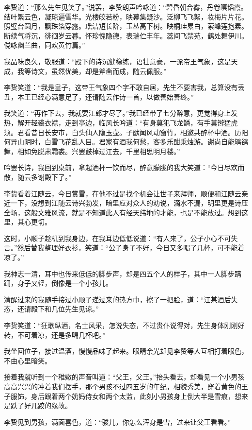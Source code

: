 李贽道：“那么先生见笑了。”说罢，李贽朗声吟咏道：“碧昏朝合雾，丹卷暝韬霞。结叶繁云色，凝琼遍雪华。光楼皎若粉，映幕集疑沙。泛柳飞飞絮，妆梅片片花。照璧台圆月，飘珠箔穿露。瑶洁短长阶，玉丛高下树。映桐珪累白，萦峰莲抱素。断续气将沉，徘徊岁云暮。怀珍愧隐德，表瑞伫丰年。蕊间飞禁苑，鹤处舞伊川。傥咏幽兰曲，同欢黄竹篇。”

我品味良久，敬服道：“殿下的诗沉健稳练，语壮意豪，一派帝王气象，这是天成，我等诗文，虽然优美，却是斧凿而成，随云佩服。”

李贽笑道：“我是皇子，这帝王气象四个字不敢自居，先生不要害我，总算没有丢丑，本王已经心满意足了，还请随云作诗一首，以做善始善终。”

我笑道：“再作下去，我就要江郎才尽了。”我已经带了七分醉意，更觉得身上发热，解开轻裘衣襟，走到亭边，临风长吟道：“有身莫犯飞龙鳞，有手莫辫猛虎须。君看昔日长安市，白头仙人隐玉壶。子猷闻风动窗竹，相邀共醉杯中酒。历阳何异山阴时，白雪飞花乱人目。君家有酒我何愁，客多乐酣秉烛游。谢尚自能鸲鹆舞，相如免脱肃霜裘。兴罢鼓棹过江去，千里相思明月楼。”

吟罢长诗，我回到桌前，拿起酒杯一饮而尽，醉意朦胧的我大笑道：“今日尽欢而散，随云多谢殿下了。”

李贽看着江随云，今日赏雪，在他不过是找个机会让世子来拜师，顺便和江随云亲近一下，没想到江随云诗兴勃发，暗里应对众人的劝说，滴水不漏，明里更是诗压全场，这般文雅风流，就是不知道此人有经天纬地的才能，也是不能放过。想到这里，其心更切。

这时，小顺子趁机到我身边，在我耳边低低说道：“有人来了，公子小心不可失言。”然后替我整理好衣衫，笑道：“公子身子不好，今日又多喝了几杯，可不能着凉了。”

我神志一清，耳中也传来低低的脚步声，却是四五个人的样子，其中一人脚步蹒跚，身子又轻，倒像是一个小孩儿。

清醒过来的我随手接过小顺子递过来的热方巾，擦了一把脸，道：“江某酒后失态，还请殿下和几位先生见谅。”

李贽笑道：“狂歌纵酒，名士风采，怎说失态，不过贵仆说得对，先生身体刚刚好转，不可着凉，还是多喝几杯吧。”

我坐回位子，接过温酒，慢慢品味了起来。眼睛余光却见李贽等人互相打着眼色，不由心里暗笑。

接着我就听到一个稚嫩的声音叫道：“父王，父王。”抬头看去，却看见一个小男孩高高兴兴的冲着我们摆手，那个男孩不过四五岁的年纪，相貌秀美，穿着黄色的王子服饰，身后跟着两个奶妈侍女和两个太监，此刻小男孩身上倒大半是雪痕，想来是跌了好几跤的缘故。

李贽见到男孩，满面喜色，道：“骏儿，你怎么浑身是雪，过来让父王看看。”

